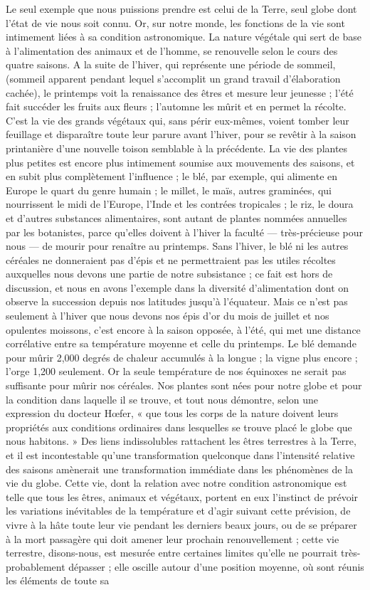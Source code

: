 \documentclass[a4paper, 11pt, oneside]{article}
\begin{document}
Le seul exemple que nous puissions prendre est celui de la Terre, seul globe dont l'état de vie nous soit connu. Or, sur notre monde, les fonctions de la vie sont intimement liées à sa condition astronomique. La nature végétale qui sert de base à l'alimentation des animaux et de l'homme, se renouvelle selon le cours des quatre saisons. A la suite de l'hiver, qui représente une période de sommeil, (sommeil apparent pendant lequel s'accomplit un grand travail d'élaboration cachée), le printemps voit la renaissance des êtres et mesure leur jeunesse ; l'été fait succéder les fruits aux fleurs ; l'automne les mûrit et en permet la récolte. C'est la vie des grands végétaux qui, sans périr eux-mêmes, voient tomber leur feuillage et disparaître toute leur parure avant l'hiver, pour se revêtir à la saison printanière d'une nouvelle toison semblable à la précédente. La vie des plantes plus petites est encore plus intimement soumise aux mouvements des saisons, et en subit plus complètement l'influence ; le blé, par exemple, qui alimente en Europe le quart du genre humain ; le millet, le maïs, autres graminées, qui nourrissent le midi de l'Europe, l'Inde et les contrées tropicales ; le riz, le doura et d'autres substances alimentaires, sont autant de plantes nommées annuelles par les botanistes, parce qu'elles doivent à l'hiver la faculté --- très-précieuse pour nous --- de mourir pour renaître au printemps. Sans l'hiver, le blé ni les autres céréales ne donneraient pas d'épis et ne permettraient pas les utiles récoltes auxquelles nous devons une partie de notre subsistance ; ce fait est hors de discussion, et nous en avons l'exemple dans la diversité d'alimentation dont on observe la succession depuis nos latitudes jusqu'à l'équateur. Mais ce n'est pas seulement à l'hiver que nous devons nos épis d'or du mois de juillet et nos opulentes moissons, c'est encore à la saison opposée, à l'été, qui met une distance corrélative entre sa température moyenne et celle du printemps. Le blé demande pour mûrir 2,000 degrés de chaleur accumulés à la longue ; la vigne plus encore ; l'orge 1,200 seulement. Or la seule température de nos équinoxes ne serait pas suffisante pour mûrir nos céréales. Nos plantes sont nées pour notre globe et pour la condition dans laquelle il se trouve, et tout nous démontre, selon une expression du docteur Hœfer, « que tous les corps de la nature doivent leurs propriétés aux conditions ordinaires dans lesquelles se trouve placé le globe que nous habitons. » Des liens indissolubles rattachent les êtres terrestres à la Terre, et il est incontestable qu'une transformation quelconque dans l'intensité relative des saisons amènerait une transformation immédiate dans les phénomènes de la vie du globe. Cette vie, dont la relation avec notre condition astronomique est telle que tous les êtres, animaux et végétaux, portent en eux l'instinct de prévoir les variations inévitables de la température et d'agir suivant cette prévision, de vivre à la hâte toute leur vie pendant les derniers beaux jours, ou de se préparer à la mort passagère qui doit amener leur prochain renouvellement ; cette vie terrestre, disons-nous, est mesurée entre certaines limites qu'elle ne pourrait très-probablement dépasser ; elle oscille autour d'une position moyenne, où sont réunis les éléments de toute sa 
\end{document}
